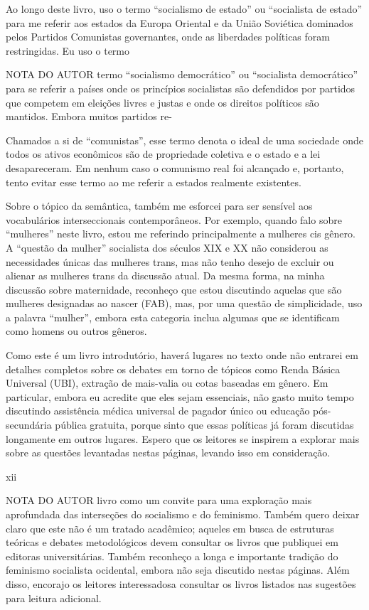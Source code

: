  \par 
Ao longo deste livro, uso o termo “socialismo de estado” ou “socialista de estado” para me referir aos estados da Europa Oriental e da União Soviética dominados pelos Partidos Comunistas governantes, onde as liberdades políticas foram restringidas. Eu uso o termo
 \par 
NOTA DO AUTOR termo “socialismo democrático” ou “socialista democrático” para se referir a países onde os princípios socialistas são defendidos por partidos que competem em eleições livres e justas e onde os direitos políticos são mantidos. Embora muitos partidos re-
 \par 
Chamados a si de “comunistas”, esse termo denota o ideal de uma sociedade onde todos os ativos econômicos são de propriedade coletiva e o estado e a lei desapareceram. Em nenhum caso o comunismo real foi alcançado e, portanto, tento evitar esse termo ao me referir a estados realmente existentes.
 \par 
Sobre o tópico da semântica, também me esforcei para ser sensível aos vocabulários interseccionais contemporâneos. Por exemplo, quando falo sobre “mulheres” neste livro, estou me referindo principalmente a mulheres cis gênero. A “questão da mulher” socialista dos séculos XIX e XX não considerou as necessidades únicas das mulheres trans, mas não tenho desejo de excluir ou alienar as mulheres trans da discussão atual. Da mesma forma, na minha discussão sobre maternidade, reconheço que estou discutindo aquelas que são mulheres designadas ao nascer (FAB), mas, por uma questão de simplicidade, uso a palavra “mulher”, embora esta categoria inclua algumas que se identificam como homens ou outros gêneros.
 \par 
Como este é um livro introdutório, haverá lugares no texto onde não entrarei em detalhes completos sobre os debates em torno de tópicos como Renda Básica Universal (UBI), extração de mais-valia ou cotas baseadas em gênero. Em particular, embora eu acredite que eles sejam essenciais, não gasto muito tempo discutindo assistência médica universal de pagador único ou educação pós-secundária pública gratuita, porque sinto que essas políticas já foram discutidas longamente em outros lugares. Espero que os leitores se inspirem a explorar mais sobre as questões levantadas nestas páginas, levando isso em consideração.
 \par 
xii
 \par 
NOTA DO AUTOR livro como um convite para uma exploração mais aprofundada das interseções do socialismo e do feminismo. Também quero deixar claro que este não é um tratado acadêmico; aqueles em busca de estruturas teóricas e debates metodológicos devem consultar os livros que publiquei em editoras universitárias. Também reconheço a longa e importante tradição do feminismo socialista ocidental, embora não seja discutido nestas páginas. Além disso, encorajo os leitores interessados ​​a consultar os livros listados nas sugestões para leitura adicional.
